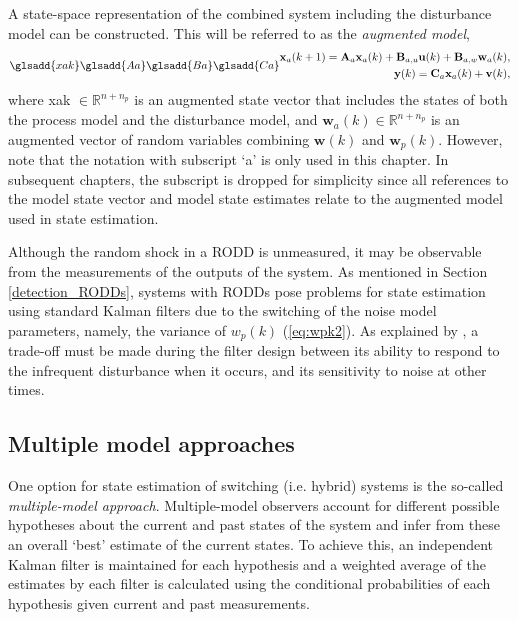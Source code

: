 A state-space representation of the combined system including the disturbance model can be constructed. This will be referred to as the \textit{augmented model},
\begin{equation} \label{eq:ss_rep_xa} \glsadd{xak} \glsadd{Aa} \glsadd{Ba} \glsadd{Ca}
	\begin{aligned}
		\mathbf{x}_a(k+1) = \mathbf{A}_a \mathbf{x}_a(k) + \mathbf{B}_{a,u} \mathbf{u}(k) + \mathbf{B}_{a,w} \mathbf{w}_{a}(k), \\
		\mathbf{y}(k) = \mathbf{C}_a \mathbf{x}_a(k) + \mathbf{v}(k),
	\end{aligned}
\end{equation}
where \gls{xak} $\in \mathbb{R}^{n+n_p}$ is an augmented state vector that includes the states of both the process model and the disturbance model, and $\mathbf{w}_a(k) \in \mathbb{R}^{n+n_p}$ is an augmented vector of random variables combining $\mathbf{w}(k)$ and $\mathbf{w}_p(k)$. However, note that the notation with subscript `a' is only used in this chapter. In subsequent chapters, the subscript is dropped for simplicity since all references to the model state vector and model state estimates relate to the augmented model used in state estimation.

Although the random shock in a \gls{RODD} is unmeasured, it may be observable from the measurements of the outputs of the system. As mentioned in Section \ref{detection_RODDs}, systems with \gls{RODD}s pose problems for state estimation using standard Kalman filters due to the switching of the noise model parameters, namely, the variance of $w_p(k)$ (\ref{eq:wpk2}). As explained by \cite{andersson_adaptive_1985}, a trade-off must be made during the filter design between its ability to respond to the infrequent disturbance when it occurs, and its sensitivity to noise at other times.


\subsection{Multiple model approaches} \label{sec:multi-model}

One option for state estimation of switching (i.e. hybrid) systems is the so-called \textit{multiple-model approach}. Multiple-model observers account for different possible hypotheses about the current and past states of the system and infer from these an overall `best' estimate of the current states. To achieve this, an independent Kalman filter is maintained for each hypothesis and a weighted average of the estimates by each filter is calculated using the conditional probabilities of each hypothesis given current and past measurements.

